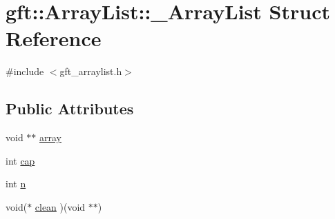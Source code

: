 \hypertarget{structgft_1_1ArrayList_1_1__ArrayList}{\section{gft\-:\-:Array\-List\-:\-:\-\_\-\-Array\-List Struct Reference}
\label{structgft_1_1ArrayList_1_1__ArrayList}
}


{\ttfamily \#include $<$gft\-\_\-arraylist.\-h$>$}

\subsection*{Public Attributes}
\begin{DoxyCompactItemize}
\item 
void $\ast$$\ast$ \hyperlink{structgft_1_1ArrayList_1_1__ArrayList_ad738f27dd09a422d567989d58566cbe6}{array}
\item 
int \hyperlink{structgft_1_1ArrayList_1_1__ArrayList_a76c12c6e45ba96915e6ba9c1d31286fd}{cap}
\item 
int \hyperlink{structgft_1_1ArrayList_1_1__ArrayList_aabc5a9bbc1e57a7e7a9a31db2902df0d}{n}
\item 
void($\ast$ \hyperlink{structgft_1_1ArrayList_1_1__ArrayList_a36b14bc3b645579e9a49ca8378d4863e}{clean} )(void $\ast$$\ast$)
\end{DoxyCompactItemize}


